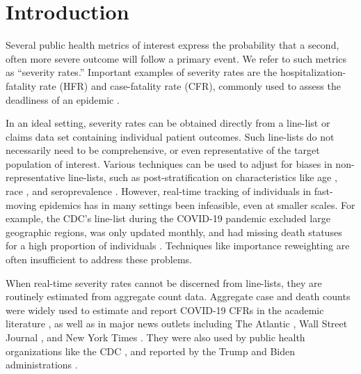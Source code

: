 \documentclass{article}
\begin{document}
\section{Introduction}

Several public health metrics of interest express the probability that a second,
often more severe outcome will follow a primary event. 
We refer to such metrics as ``severity rates.''
Important examples of severity rates are the hospitalization-fatality rate (HFR) 
  and case-fatality rate (CFR),
commonly used to assess the deadliness of an epidemic \citep{cfr_line_list, timevar_ifr, lancet_ifr, HFR_linelist3}. %



In an ideal setting, severity rates can be obtained directly from a %
line-list or claims data set containing individual patient outcomes. 
Such line-lists do not necessarily need to be comprehensive, or even representative of the target population of interest.
Various techniques can be used to adjust for biases in non-representative line-lists, such as post-stratification on characteristics like age \citep{nishiuraEx2}, race \citep{HFR_linelist2}, and seroprevalence \citep{lancet_ifr}.
However, real-time tracking of individuals in fast-moving epidemics
has in many settings been infeasible, even at smaller scales. 
For example, the CDC's line-list during the COVID-19 pandemic excluded large geographic regions, was only updated monthly, and had missing death statuses for a high proportion of individuals \citep{CDC_line_list}. 
Techniques like importance reweighting are often insufficient to address these problems.

When real-time severity rates cannot be discerned from line-lists, they 
are routinely estimated from aggregate count data. 
Aggregate case and death counts were widely used to estimate and report COVID-19 CFRs in the academic literature \citep{yuan2020monitoring,
  horita2022global, LIU2023100350, germany}, as well as in major news outlets including
The Atlantic \citep{atlantic}, Wall Street Journal \citep{wsj}, and New York Times \citep{nyt}. 
They were also used by public health organizations like the CDC \citep{ahmad2023covid,mississippi}, and reported by the Trump and Biden administrations \citep{whitehouse2020mcenany, whitehouse2021briefing}. 
\end{document}
